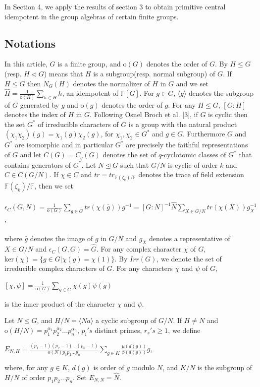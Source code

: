 \documentclass[12pt, reqno]{amsart}
\numberwithin{equation}{section}
\theoremstyle{definition}
\theoremstyle{remark}
\theoremstyle{plain}
\begin{document}
In Section 4, we apply the results of section 3 to obtain primitive central idempotent in the group algebras of certain finite groups.

\subsection*{Notations}
In this article, $G$ is a finite group, and $\text{o}(G)$ denotes the order of $G$. By $H\leq G$ (resp. $H\triangleleft G$) means that $H$ is a subgroup(resp. normal subgroup) of $G$. If $H\leq G$ then $N_G(H)$ denotes the normalizer of $H$ in $G$ and we set $\hat{H}=\frac{1}{\text{o}(H)}\sum_{h\in H}h$, an idempotent of $\mathbb{F}[G]$. For $g\in G$, $\langle g\rangle$ denotes the subgroup of $G$ generated by $g$ and $\text{o}(g)$ denotes the order of $g$. For any $H\leq G$, $[G:H]$ denotes the index of $H$ in $G$. Following Osnel Broch et al. [3], if $G$ is cyclic then the set $G^*$ of irreducible characters of $G$ is a group with the natural product $(\chi_1\chi_2)(g)=\chi_1(g)\chi_2(g)$, for $\chi_1,\chi_2\in G^*$ and $g\in G$. Furthermore $G$ and $G^*$ are isomorphic and in particular $G^*$ are precisely the faithful representations of $G$ and let $C(G)=C_q(G)$ denotes the set of $q$-cyclotomic classes of $G^*$ that contains generators of $G^*$. Let $N\trianglelefteq G$ such that $G/N$ is cyclic of order $k$ and $C\in C(G/N)$. If $\chi\in C$ and $tr=tr_{\mathbb{F}(\zeta_k)/\mathbb{F}}$ denotes the trace of field extension $\mathbb{F}(\zeta_k)/\mathbb{F}$, then we set \\\\
$\epsilon_C(G,N)=\frac{1}{\text{o}(G)}\sum_{g\in G}tr(\chi(\overline{g}))g^{-1}=[G:N]^{-1}\hat{N}\sum_{X\in G/N}tr(\chi(X))g^{-1}_X$,\\\\ where $\bar{g}$ denotes the image of $g$ in $G/N$ and $g_X$ denotes a representative of $X\in G/N$ and $\epsilon_C(G,G)=\hat{G}$. For any complex character $\chi$ of $G$, $\text{ker}(\chi)=\{g\in G|\chi(g)=\chi(1)\}$. By $Irr(G)$, we denote the set of irreducible complex characters of $G$. For any characters $\chi$ and $\psi$ of $G$,
\begin{center}
  $[\chi,\psi]=\frac{1}{\text{o}(G)}\sum_{g\in G}\chi(g)\overline{\psi(g)}$
\end{center}
is the inner product of the character $\chi$ and $\psi$.\smallskip

Let $N\trianglelefteq G$, and $H/N=\langle Na \rangle$ a cyclic subgroup of $G/N$. If $H\neq N$ and $\text{o}(H/N)=p^{\alpha_1}_{1}p^{\alpha_2}_{2}...p^{\alpha_n}_{n}$, $p_i's$ distinct primes, $r_s's\geq 1$, we define
\begin{center}
  $E_{N,H}=\frac{(p_1-1)(p_2-1)...(p_n-1)}{\text{o}(N)p_1p_2...p_n}\sum_{g\in K}\frac{\mu(d(g))}{\phi(d(g))}g$,
\end{center}
where, for any $g\in K$, $d(g)$ is order of $g$ modulo $N$, and $K/N$ is the subgroup of $H/N$ of order $p_1p_2...p_n$. Set $E_{N,N}=\hat{N}$.
\end{document}
